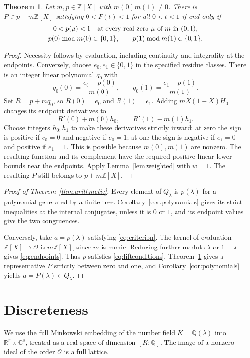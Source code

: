 \documentclass[11pt]{article}
\newtheorem{theorem}{Theorem}
\theoremstyle{remark}
\newcommand{\Z}{\mathbb Z}
\newcommand{\Q}{\mathbb Q}
\newcommand{\R}{\mathbb R}
\newcommand{\C}{\mathbb C}
\newcommand{\Oa}{\mathcal O}
\begin{document}
\begin{theorem}\label{thm:lift}
Let $m,p\in\Z[X]$ with $m(0)m(1)\ne0$. There is $P\in p+m\Z[X]$ satisfying $0<P(t)<1$ for all $0<t<1$ if and only if
\begin{equation}\label{eq:liftconditions}
\begin{gathered}
 0<p(\mu)<1\quad\hbox{at every real zero $\mu$ of $m$ in $(0,1)$},\\
 p(0)\bmod m(0)\in\{0,1\},\qquad
 p(1)\bmod m(1)\in\{0,1\}.
\end{gathered}
\end{equation}
\end{theorem}
\begin{proof}
Necessity follows by evaluation, including continuity and integrality at the endpoints. Conversely, choose $e_0,e_1\in\{0,1\}$ in the specified residue classes. There is an integer linear polynomial $q_0$ with
\[
 q_0(0)=\frac{e_0-p(0)}{m(0)},\qquad
 q_0(1)=\frac{e_1-p(1)}{m(1)}.
\]
Set $R=p+mq_0$, so $R(0)=e_0$ and $R(1)=e_1$. Adding $mX(1-X)H_0$ changes its endpoint derivatives to
\[
 R'(0)+m(0)h_0,\qquad R'(1)-m(1)h_1.
\]
Choose integers $h_0,h_1$ to make these derivatives strictly inward: at zero the sign is positive if $e_0=0$ and negative if $e_0=1$; at one the sign is negative if $e_1=0$ and positive if $e_1=1$. This is possible because $m(0),m(1)$ are nonzero. The resulting function and its complement have the required positive linear lower bounds near the endpoints. Apply Lemma~\ref{lem:weighted} with $w=1$. The resulting $P$ still belongs to $p+m\Z[X]$.
\end{proof}

\begin{proof}[Proof of Theorem~\ref{thm:arithmetic}]
Every element of $Q_\lambda$ is $p(\lambda)$ for a polynomial generated by a finite tree. Corollary~\ref{cor:polynomials} gives its strict inequalities at the internal conjugates, unless it is $0$ or $1$, and its endpoint values give the two congruences.

Conversely, take $a=p(\lambda)$ satisfying \eqref{eq:criterion}. The kernel of evaluation $\Z[X]\to\Oa$ is $m\Z[X]$, since $m$ is monic. Reducing further modulo $\lambda$ or $1-\lambda$ gives \eqref{eq:endpoints}. Thus $p$ satisfies \eqref{eq:liftconditions}. Theorem~\ref{thm:lift} gives a representative $P$ strictly between zero and one, and Corollary~\ref{cor:polynomials} yields $a=P(\lambda)\in Q_\lambda$.
\end{proof}

\section{Discreteness}
We use the full Minkowski embedding of the number field $K=\Q(\lambda)$ into $\R^r\times\C^s$, treated as a real space of dimension $[K:\Q]$. The image of a nonzero ideal of the order $\Oa$ is a full lattice.
\end{document}
